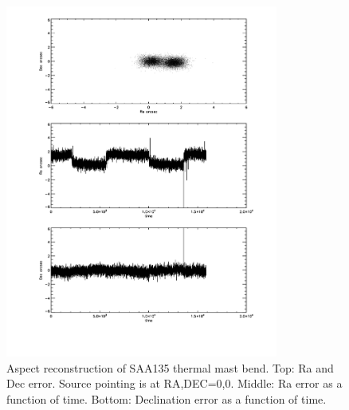 \begin{figure}[tb]
\begin{center}
\includegraphics[width=0.8\textwidth]{images/saa135.pdf}
\caption{Aspect reconstruction of SAA135 thermal mast bend. Top: Ra and Dec error. Source pointing is at RA,DEC=0,0. Middle: Ra error as a function of time. Bottom: Declination error as a function of time. }
\label{saa135nusim}
\end{center}
\end{figure}

